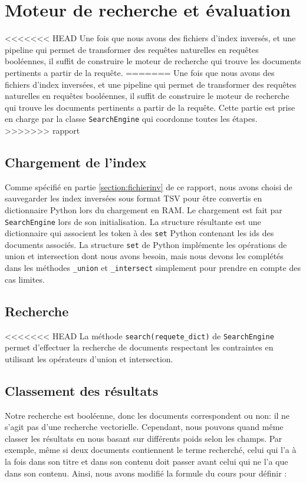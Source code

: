 \chapter{Moteur de recherche et évaluation}

<<<<<<< HEAD
Une fois que nous avons des fichiers d'index inversés, et une pipeline qui permet de transformer des requêtes naturelles en requêtes booléennes, 
il suffit de construire le moteur de recherche qui trouve les documents pertinents a partir de la requête. 
=======
Une fois que nous avons des fichiers d'index inversées, et une pipeline qui permet de transformer des requêtes naturelles en requêtes booléennes, 
il suffit de construire le moteur de recherche qui trouve les documents pertinents a partir de la requête. Cette partie est prise en charge par la classe \texttt{SearchEngine} qui coordonne toutes les étapes.
>>>>>>> rapport

\section{Chargement de l'index}

Comme spécifié en partie \ref{section:fichierinv} de ce rapport, nous avons choisi de sauvegarder les index inversées sous format TSV pour être convertis en dictionnaire Python lors du chargement en RAM. Le chargement est fait par \texttt{SearchEngine} lors de son initialisation. La structure résultante est une dictionnaire qui associent les token à des \texttt{set} Python contenant les ids des documents associés. La structure \texttt{set} de Python implémente les opérations de union et intersection dont nous avons besoin, mais nous devons les complétés dans les méthodes \texttt{\_union} et \texttt{\_intersect} simplement pour prendre en compte des cas limites. 


\section{Recherche}

<<<<<<< HEAD
La méthode \texttt{search(requete\_dict)} de \texttt{SearchEngine} permet d'effectuer la recherche de documents respectant les contraintes en utilisant les opérateurs d'union et intersection.

\section{Classement des résultats}

Notre recherche est booléenne, donc les documents correspondent ou non: il ne s'agit pas d'une recherche vectorielle. Cependant, nous pouvons quand même classer les résultats en nous basant sur différents poids selon les champs. Par exemple, même si deux documents contiennent le terme recherché, celui qui l'a à la fois dans son titre et dans son contenu doit passer avant celui qui ne l'a que dans son contenu. Ainsi, nous avons modifié la formule du cours pour définir :

